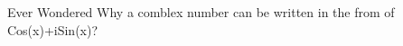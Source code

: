 \documentclass[preview]{standalone}
\begin{document}
\begin{center}
Ever Wondered Why a comblex number can be written in the from of Cos(x)+iSin(x)?
\end{center}
\end{document}
